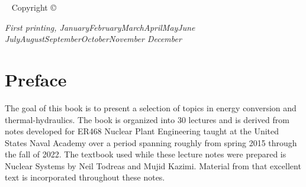 \documentclass{tufte-book}
\newcommand{\monthyear}{%
  \ifcase\month\or January\or February\or March\or April\or May\or June\or
  July\or August\or September\or October\or November\or
  December\fi\space\number\year
}
\begin{document}
\maketitle


\newpage
\begin{fullwidth}
~\vfill
\thispagestyle{empty}
\setlength{\parindent}{0pt}
\setlength{\parskip}{\baselineskip}
Copyright \copyright\ \the\year\ \thanklessauthor
\par{}

%

\par\textit{First printing, \monthyear}
\end{fullwidth}

\tableofcontents

\listoffigures

\listoftables



\cleardoublepage
\chapter*{Preface}

The goal of this book is to present a selection of topics in energy conversion and thermal-hydraulics.  The book is organized into 30 lectures and is derived from notes developed for ER468 Nuclear Plant Engineering taught at the United States Naval Academy over a period spanning roughly from spring 2015 through the fall of 2022.  The textbook used while these lecture notes were prepared is Nuclear Systems by Neil Todreas and Mujid Kazimi.\cite{todreasNS}  Material from that excellent text is incorporated throughout these notes.
\end{document}
